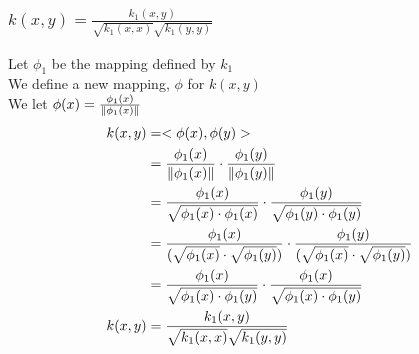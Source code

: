 \documentclass[letterpaper, 12]{article}
\begin{document}
\subsubsection{$k(x, y) = \frac{k_{1}(x ,y) }{\sqrt{k_{1}(x, x)} \sqrt{k_{1}(y, y)} }$}
Let $\phi_{1}$ be the mapping defined by $k_{1}$\\
We define a new mapping, $\phi$ for $k(x ,y)$\\
We let $\phi(x) = \frac{\phi_{1} (x)}{\norm{\phi_{1}(x)}}$\\
\begin{equation*}
\begin{split}
k(x, y) &= <\phi (x), \phi (y)>\\
&= \frac{\phi_{1}(x)}{\norm{\phi_{1}(x)}} \cdot  \frac{\phi_{1}(y)}{\norm{\phi_{1}(y)}}\\
&= \frac{\phi_{1}(x)}{\sqrt{\phi_{1}(x) \cdot \phi_{1}(x)}} \cdot \frac{\phi_{1}(y)}{\sqrt{\phi_{1}(y) \cdot \phi_{1}(y)}}\\
&= \frac{\phi_{1}(x)}{( \sqrt{\phi_{1}(x)} \cdot \sqrt{ \phi_{1}(y)}  )}  \cdot \frac{\phi_{1}(y)}{( \sqrt{\phi_{1}(x)} \cdot \sqrt{ \phi_{1}(y)}  )} \\
&= \frac{\phi_{1}(x)}{ \sqrt{\phi_{1}(x) \cdot  \phi_{1}(y) }}  \cdot  \frac{\phi_{1}(x)}{ \sqrt{\phi_{1}(x) \cdot  \phi_{1}(y) }}\\
 k(x, y) &= \frac{k_{1}(x ,y) }{\sqrt{k_{1}(x, x)} \sqrt{k_{1}(y, y)} }
\end{split}
\end{equation*}
\end{document}

